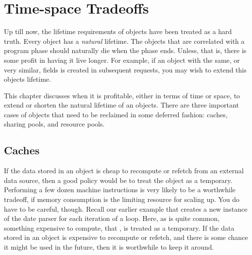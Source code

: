 



\chapter{Time-space Tradeoffs}
\label{balance-time-and-space}
\label{sec:time-space-tradeoffs}



Up till now, the lifetime requirements of objects have been treated as a hard
truth. Every object has a \emph{natural} lifetime.
The objects that are correlated with a program phase should naturally die when
the phase ends. Unless, that is, there is some profit in having it live longer.
For example, if an object with the same, or very similar, fields is created in
subsequent requests, you may wish to extend this objects lifetime.


This chapter discusses when it is profitable, either in terms of time or space,
to extend or shorten the natural lifetime of an objects. There are three
important cases of objects that need to be reclaimed in some deferred fashion:
caches, sharing pools, and resource pools.


\section{Caches}
\label{sec:caches}

If the data stored in an object is cheap to recompute or refetch from an
external data source, then a good policy would be to treat the object as a
temporary. Performing a few dozen machine instructions is very likely to be a
worthwhile tradeoff, if memory consumption is the limiting resource for
scaling up. 
You do have to be careful, though. Recall our earlier example that creates a new
instance of the date parser  for each iteration of a
loop. Here, as is quite common, something expensive to compute, that
, is treated as a temporary. If the data stored in an
object is expensive to recompute or refetch, and there is some chance it might
be used in the future, then it is worthwhile to keep it around.

